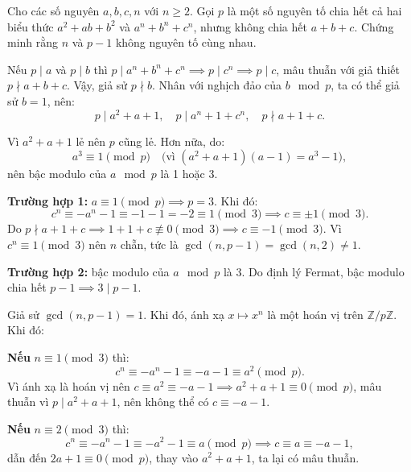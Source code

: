 \ifshowproblemandsoln
\ifshowproblem\begin{problem}\label{problem:FRA-2015-TST1-P7}\fi
\ifshowsoln\begin{problem}\fi
    Cho các số nguyên $a, b, c, n$ với $n \geq 2$.
    Gọi $p$ là một số nguyên tố chia hết cả hai biểu thức $a^2 + ab + b^2$ và $a^n + b^n + c^n$, nhưng không chia hết $a + b + c$.  
    Chứng minh rằng $n$ và $p - 1$ không nguyên tố cùng nhau.
\end{problem}
\fi

\ifshowsoln
\begin{soln}\footnotemark
    Nếu \( p \mid a \) và \( p \mid b \) thì \( p \mid a^n + b^n + c^n \implies p \mid c^n \implies p \mid c \),
    mâu thuẫn với giả thiết \( p \nmid a + b + c \). Vậy, giả sử \( p \nmid b \). Nhân với nghịch đảo của \( b \mod p \), ta có thể giả sử \( b = 1 \), nên:
    \[
        p \mid a^2 + a + 1, \quad p \mid a^n + 1 + c^n, \quad p \nmid a + 1 + c.
    \]

    Vì \( a^2 + a + 1 \) lẻ nên \( p \) cũng lẻ. Hơn nữa, do:
    \[
        a^3 \equiv 1 \pmod{p} \quad \text{(vì } (a^2 + a + 1)(a - 1) = a^3 - 1),
    \]
    nên bậc modulo của \( a \mod p \) là 1 hoặc 3.

    \textbf{Trường hợp 1:} \( a \equiv 1 \pmod{p} \implies p = 3 \). Khi đó:
    \[
        c^n \equiv -a^n - 1 \equiv -1 - 1 = -2 \equiv 1 \pmod{3} \implies c \equiv \pm 1 \pmod{3}.
    \]
    Do \( p \nmid a + 1 + c \implies 1 + 1 + c \not\equiv 0 \pmod{3} \implies c \equiv -1 \pmod{3} \).
    Vì \( c^n \equiv 1 \pmod{3} \) nên \( n \) chẵn, tức là \( \gcd(n, p - 1) = \gcd(n, 2) \ne 1 \).

    \textbf{Trường hợp 2:} bậc modulo của \( a \mod p \) là 3. Do định lý Fermat, bậc modulo chia hết \( p - 1 \implies 3 \mid p - 1 \).

    Giả sử \( \gcd(n, p - 1) = 1 \). Khi đó, ánh xạ \( x \mapsto x^n \) là một hoán vị trên \( \mathbb{Z}/p\mathbb{Z} \). Khi đó:

    \textbf{Nếu } \( n \equiv 1 \pmod{3} \) thì:
    \[
        c^n \equiv -a^n - 1 \equiv -a - 1 \equiv a^2 \pmod{p}.
    \]
    Vì ánh xạ là hoán vị nên \( c \equiv a^2 \equiv -a - 1 \implies a^2 + a + 1 \equiv 0 \pmod{p} \),
    mâu thuẫn vì \( p \mid a^2 + a + 1 \), nên không thể có \( c \equiv -a - 1 \).

    \textbf{Nếu } \( n \equiv 2 \pmod{3} \) thì:
    \[
        c^n \equiv -a^n - 1 \equiv -a^2 - 1 \equiv a \pmod{p} \implies c \equiv a \equiv -a - 1,
    \]
    dẫn đến \( 2a + 1 \equiv 0 \pmod{p} \), thay vào \( a^2 + a + 1 \), ta lại có mâu thuẫn.


\end{soln}
\end{problem}
